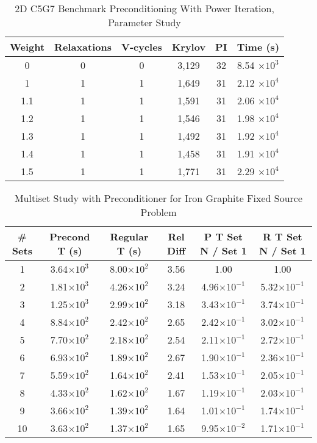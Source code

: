 \begin{table}[!h]
\caption{2D C5G7 Benchmark Preconditioning With Power Iteration, Parameter Study}
\begin{center}
\begin{tabular}{c c c c c c}
\hline
Weight & Relaxations & V-cycles & Krylov & PI & Time (s) \\[0.5ex]
\hline
0    & 0 & 0 & 3,129 & 32 & 8.54 $\times 10^{3}$ \\
1    & 1 & 1 & 1,649 & 31 & 2.12 $\times 10^{4}$ \\
1.1 & 1 & 1 & 1,591 & 31 & 2.06 $\times 10^{4}$ \\
1.2 & 1 & 1 & 1,546 & 31 & 1.98 $\times 10^{4}$ \\
1.3 & 1 & 1 & 1,492 & 31 & 1.92 $\times 10^{4}$ \\
1.4 & 1 & 1 & 1,458 & 31 & 1.91 $\times 10^{4}$ \\
1.5 & 1 & 1 & 1,771 & 31 & 2.29 $\times 10^{4}$ \\
\hline 
\end{tabular} 
\end{center}
\label{table:2D c5g7}
\end{table}

\begin{table}[!h]
\caption{Multiset Study with Preconditioner for Iron Graphite Fixed Source Problem}
\begin{center}
\begin{tabular}{c c c c c c}
\hline
\# Sets & Precond T (s) & Regular T (s) & Rel Diff & P T Set N / Set 1 & R T Set N / Set 1 \\[0.5ex]
\hline
1   & 3.64$\times 10^{3}$  & 8.00$\times 10^{2}$ & 3.56 & 1.00                              & 1.00 \\
2   & 1.81$\times 10^{3}$	& 4.26$\times 10^{2}$ & 3.24 & 4.96$\times 10^{-1}$ & 5.32$\times 10^{-1}$ \\
3   & 1.25$\times 10^{3}$	& 2.99$\times 10^{2}$ & 3.18 & 3.43$\times 10^{-1}$ & 3.74$\times 10^{-1}$ \\
4   & 8.84$\times 10^{2}$	& 2.42$\times 10^{2}$ & 2.65 & 2.42$\times 10^{-1}$ & 3.02$\times 10^{-1}$ \\ 
5   & 7.70$\times 10^{2}$	& 2.18$\times 10^{2}$ & 2.54 & 2.11$\times 10^{-1}$ & 2.72$\times 10^{-1}$ \\
6   & 6.93$\times 10^{2}$	& 1.89$\times 10^{2}$ & 2.67 & 1.90$\times 10^{-1}$ & 2.36$\times 10^{-1}$ \\
7   & 5.59$\times 10^{2}$	& 1.64$\times 10^{2}$ & 2.41 & 1.53$\times 10^{-1}$ & 2.05$\times 10^{-1}$ \\
8   & 4.33$\times 10^{2}$	& 1.62$\times 10^{2}$ & 1.67 & 1.19$\times 10^{-1}$ & 2.03$\times 10^{-1}$ \\
9   & 3.66$\times 10^{2}$	& 1.39$\times 10^{2}$ & 1.64 & 1.01$\times 10^{-1}$ & 1.74$\times 10^{-1}$ \\
10 & 3.63$\times 10^{2}$	& 1.37$\times 10^{2}$ & 1.65 & 9.95$\times 10^{-2}$ & 1.71$\times 10^{-1}$ \\
\hline 
\end{tabular} 
\end{center}
\label{table:FeC multisets}
\end{table}

